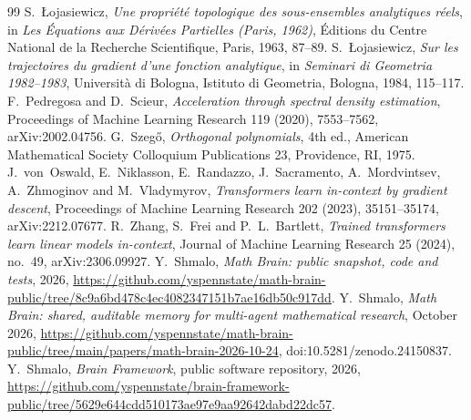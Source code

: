 \documentclass[11pt]{amsart}
\theoremstyle{remark}
\numberwithin{equation}{section}
\begin{document}
\begin{thebibliography}{99}
 S.~\L{}ojasiewicz, \emph{Une propri\'et\'e topologique des sous-ensembles analytiques r\'eels}, in \emph{Les \'Equations aux D\'eriv\'ees Partielles (Paris, 1962)}, \'Editions du Centre National de la Recherche Scientifique, Paris, 1963, 87--89.
 S.~\L{}ojasiewicz, \emph{Sur les trajectoires du gradient d'une fonction analytique}, in \emph{Seminari di Geometria 1982--1983}, Universit\`a di Bologna, Istituto di Geometria, Bologna, 1984, 115--117.
 F.~Pedregosa and D.~Scieur, \emph{Acceleration through spectral density estimation}, Proceedings of Machine Learning Research 119 (2020), 7553--7562, arXiv:2002.04756.
 G.~Szeg\H{o}, \emph{Orthogonal polynomials}, 4th ed., American Mathematical Society Colloquium Publications 23, Providence, RI, 1975.
 J.~von~Oswald, E.~Niklasson, E.~Randazzo, J.~Sacramento, A.~Mordvintsev, A.~Zhmoginov and M.~Vladymyrov, \emph{Transformers learn in-context by gradient descent}, Proceedings of Machine Learning Research 202 (2023), 35151--35174, arXiv:2212.07677.
 R.~Zhang, S.~Frei and P.~L.~Bartlett, \emph{Trained transformers learn linear models in-context}, Journal of Machine Learning Research 25 (2024), no.~49, arXiv:2306.09927.
 Y.~Shmalo, \emph{Math Brain: public snapshot, code and tests}, 2026, \url{https://github.com/yspennstate/math-brain-public/tree/8c9a6bd478c4ec4082347151b7ae16db50c917dd}.
 Y.~Shmalo, \emph{Math Brain: shared, auditable memory for multi-agent mathematical research}, October 2026, \url{https://github.com/yspennstate/math-brain-public/tree/main/papers/math-brain-2026-10-24}, doi:10.5281/zenodo.24150837.
 Y.~Shmalo, \emph{Brain Framework}, public software repository, 2026, \url{https://github.com/yspennstate/brain-framework-public/tree/5629e644cdd510173ae97e9aa92642dabd22dc57}.
\end{thebibliography}
\end{document}
